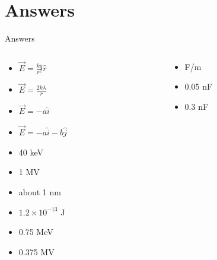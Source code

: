 \documentclass{beamer}
\begin{document}
\section{Answers}

\begin{frame}{Answers}
\small
\begin{columns}[T]
\begin{column}{0.5\textwidth}
\begin{itemize}
\item $\vec{E} = \frac{kq}{r^2}\hat{r}$
\item $\vec{E} = \frac{2k\lambda}{r}$
\item $\vec{E} = -a\hat{i}$
\item $\vec{E} = -a\hat{i}-b\hat{j}$
\item 40 keV
\item 1 MV
\item about 1 nm
\item $1.2 \times 10^{-13}$ J
\item 0.75 MeV
\item 0.375 MV
\end{itemize}
\end{column}
\begin{column}{0.5\textwidth}
\begin{itemize}
\item F/m
\item 0.05 nF
\item 0.3 nF
\end{itemize}
\end{column}
\end{columns}
\end{frame}
\end{document}
